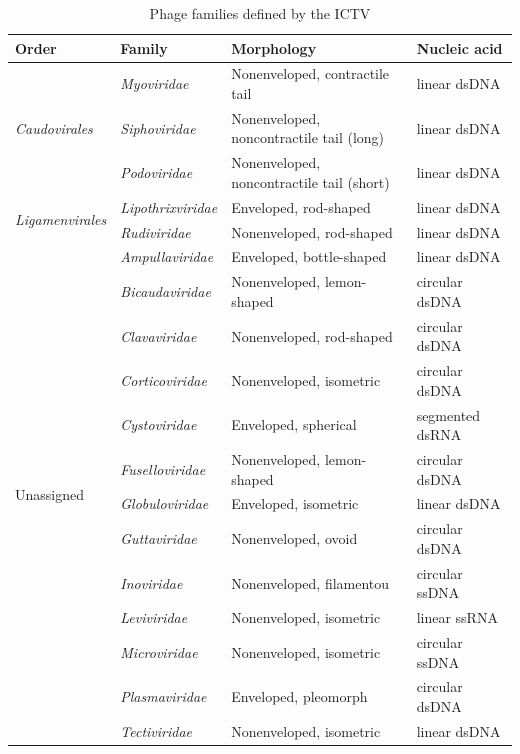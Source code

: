 \begin{table}[t]
    \caption{Phage families defined by the ICTV}
    \centering
    \scriptsize
    \begin{tabularx}{\textwidth}{lXlX}
    \toprule
    Order & Family & Morphology & Nucleic acid \\
    \midrule
    \multirow{3}{*}{\emph{Caudovirales}} & \emph{Myoviridae} & Nonenveloped, contractile tail & linear dsDNA \\
                                  & \emph{Siphoviridae} & Nonenveloped, noncontractile tail (long) & linear dsDNA \\
                                  & \emph{Podoviridae} & Nonenveloped, noncontractile tail (short) & linear dsDNA \\
    \midrule
    \multirow{2}{*}{\emph{Ligamenvirales}} & \emph{Lipothrixviridae} & Enveloped, rod-shaped & linear dsDNA \\
                                    & \emph{Rudiviridae} & Nonenveloped, rod-shaped & linear dsDNA \\
    \midrule
    \multirow{13}{*}{Unassigned} & \emph{Ampullaviridae} & Enveloped, bottle-shaped & linear dsDNA\\
                                 & \emph{Bicaudaviridae} & Nonenveloped, lemon-shaped & circular dsDNA \\
                                 & \emph{Clavaviridae}   & Nonenveloped, rod-shaped & circular dsDNA \\
                                 & \emph{Corticoviridae} & Nonenveloped, isometric & circular dsDNA \\
                                 & \emph{Cystoviridae}   & Enveloped, spherical & segmented dsRNA \\
                                 & \emph{Fuselloviridae} & Nonenveloped, lemon-shaped & circular dsDNA \\
                                 & \emph{Globuloviridae} & Enveloped, isometric& linear dsDNA \\
                                 & \emph{Guttaviridae}   & Nonenveloped, ovoid & circular dsDNA \\
                                 & \emph{Inoviridae}     & Nonenveloped, filamentou& circular ssDNA \\
                                 & \emph{Leviviridae}    & Nonenveloped, isometric & linear ssRNA \\
                                 & \emph{Microviridae}   & Nonenveloped, isometric & circular ssDNA \\
                                 & \emph{Plasmaviridae}  & Enveloped, pleomorph& circular dsDNA \\
                                 & \emph{Tectiviridae}   & Nonenveloped, isometric & linear dsDNA \\
    \bottomrule
    \end{tabularx}
    \label{phage:table:families}
\end{table}


